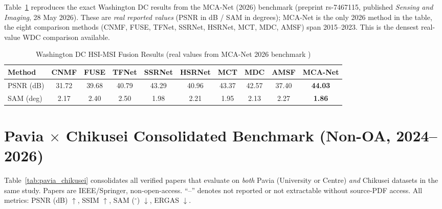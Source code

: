 \documentclass[conference]{IEEEtran}
\begin{document}
Table~\ref{tab:wdcbench} reproduces the exact Washington DC results from the MCA-Net (2026)
benchmark \cite{mcanet2026} (preprint rs-7467115, published \emph{Sensing and Imaging}, 28 May 2026).
These are \emph{real reported values} (PSNR in dB / SAM in degrees); MCA-Net is the only 2026 method
in the table, the eight comparison methods (CNMF, FUSE, TFNet, SSRNet, HSRNet, MCT, MDC, AMSF) span
2015--2023. This is the densest real-value WDC comparison available.

\begin{table}[htbp]
\caption{Washington DC HSI-MSI Fusion Results (real values from MCA-Net 2026 benchmark \cite{mcanet2026})}
\label{tab:wdcbench}
\begin{center}
\begin{adjustbox}{width=\textwidth}
\begin{tabular}{lccccccccc}
\toprule
\textbf{Method} & \textbf{CNMF} & \textbf{FUSE} & \textbf{TFNet} & \textbf{SSRNet} & \textbf{HSRNet} & \textbf{MCT} & \textbf{MDC} & \textbf{AMSF} & \textbf{MCA-Net} \\
\midrule
PSNR (dB) & 31.72 & 39.68 & 40.79 & 43.29 & 40.96 & 43.37 & 42.57 & 37.40 & \textbf{44.03} \\
SAM (deg) & 2.17 & 2.40 & 2.50 & 1.98 & 2.21 & 1.95 & 2.13 & 2.27 & \textbf{1.86} \\
\bottomrule
\end{tabular}
\end{adjustbox}
\end{center}
\end{table}

\section{Pavia $\times$ Chikusei Consolidated Benchmark (Non-OA, 2024--2026)}

Table~\ref{tab:pavia_chikusei} consolidates all verified papers that evaluate on \emph{both}
Pavia (University or Centre) \emph{and} Chikusei datasets in the same study. Papers are
IEEE/Springer, non-open-access. ``--'' denotes not reported or not extractable without source-PDF
access. All metrics: PSNR (dB) $\uparrow$, SSIM $\uparrow$, SAM ($^\circ$) $\downarrow$, ERGAS $\downarrow$.
\end{document}
